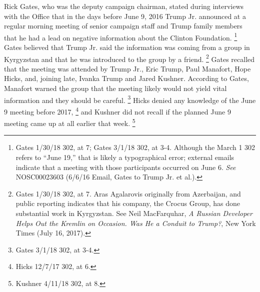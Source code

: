 Rick Gates, who was the deputy campaign chairman, stated during interviews with the Office that in the days before June 9, 2016 Trump Jr. announced at a regular morning meeting of senior campaign staff and Trump family members that he had a lead on negative information about the Clinton Foundation.%
\footnote{Gates 1/30/18 302, at 7; 
Gates 3/1/18 302, at 3-4. 
Although the March 1 302 refers to “June 19,” that is likely a typographical error; 
external emails indicate that a meeting with those participants occurred on June 6. 
\textit{See} NOSC00023603 (6/6/16 Email, Gates to Trump Jr. et al.).}
Gates believed that Trump Jr. said the information was coming from a group in Kyrgyzstan and that he was introduced to the group by a friend.%
\footnote{Gates 1/30/18 302, at 7. 
Aras Agalarovis originally from Azerbaijan, and public reporting indicates that his company, the Crocus Group, has done substantial work in Kyrgyzstan. 
See Neil MacFarquhar, \textit{A Russian Developer Helps Out the Kremlin on Occasion. Was He a Conduit to Trump?}, New York Times (July 16, 2017).}
Gates recalled that the meeting was attended by Trump Jr., Eric Trump, Paul Manafort, Hope Hicks, and, joining late, Ivanka Trump and Jared Kushner.
According to Gates, Manafort warned the group that the meeting likely would not yield vital information and they should be careful.%
\footnote{Gates 3/1/18 302, at 3-4.}
Hicks denied any knowledge of the June 9 meeting before 2017,%
\footnote{Hicks 12/7/17 302, at 6.}
and Kushner did not recall if the planned June 9 meeting came up at all earlier that week.%
\footnote{Kushner 4/11/18 302, at 8.}

